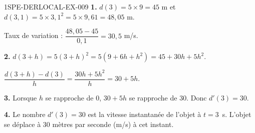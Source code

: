 \begin{corrige}{1SPE-DERLOCAL-EX-009}
\textbf{1.} $d(3)=5\times 9=45$ m et $d(3{,}1)=5\times 3{,}1^2=5\times 9{,}61=48{,}05$ m.

Taux de variation : $\dfrac{48{,}05-45}{0{,}1}=30{,}5$ m/s.

\textbf{2.} $d(3+h)=5(3+h)^2=5(9+6h+h^2)=45+30h+5h^2$.

$\dfrac{d(3+h)-d(3)}{h}=\dfrac{30h+5h^2}{h}=30+5h$.

\textbf{3.} Lorsque $h$ se rapproche de $0$, $30+5h$ se rapproche de $30$. Donc $d'(3)=30$.

\textbf{4.} Le nombre $d'(3)=30$ est la vitesse instantanée de l'objet à $t=3$~s. L'objet se déplace à $30$ mètres par seconde (m/s) à cet instant.
\end{corrige}
